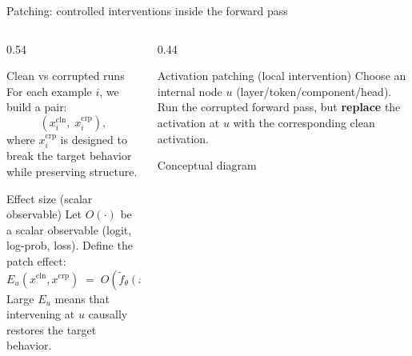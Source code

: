 \documentclass[aspectratio=169,xcolor={dvipsnames}]{beamer}
\renewcommand{\accent}[1]{\textbf{#1}}
\begin{document}
\begin{frame}[shrink=20]{Patching: controlled interventions inside the forward pass}
\small
\begin{columns}[T,onlytextwidth]
\begin{column}{0.54\textwidth}
\begin{block}{Clean vs corrupted runs}
For each example $i$, we build a pair:
\[
(x_i^{\mathrm{cln}},\; x_i^{\mathrm{crp}}),
\]
where $x_i^{\mathrm{crp}}$ is designed to break the target behavior while preserving structure.
\end{block}

\begin{block}{Effect size (scalar observable)}
Let $O(\cdot)$ be a scalar observable (logit, log-prob, loss). Define the patch effect:
\[
E_u(x^{\mathrm{cln}},x^{\mathrm{crp}})
\;=\;
O\!\left(\tilde f_\theta(x^{\mathrm{crp}};u)\right)-O\!\left(f_\theta(x^{\mathrm{crp}})\right).
\]
Large $E_u$ means that intervening at $u$ causally restores the target behavior.
\end{block}


\end{column}

\begin{column}{0.44\textwidth}

\begin{block}{Activation patching (local intervention)}
Choose an internal node $u$ (layer/token/component/head). Run the corrupted forward pass, but
\accent{replace} the activation at $u$ with the corresponding clean activation.
\end{block}


\begin{block}{Conceptual diagram}
\centering
{}
\end{block}
\end{column}
\end{columns}
\end{frame}
\end{document}
